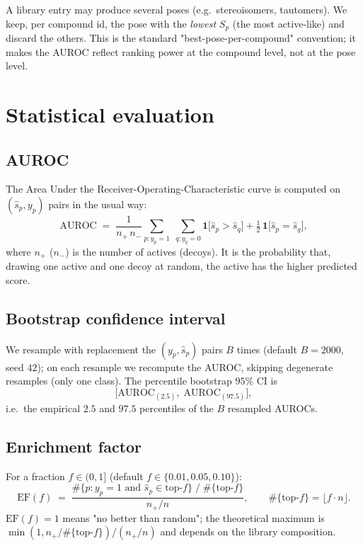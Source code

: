 \documentclass[11pt]{article}
\newcommand{\Indic}{\mathbf{1}}
\begin{document}
A library entry may produce several poses (e.g.\ stereoisomers,
tautomers). We keep, per compound id, the pose with the \emph{lowest}
$S_p$ (the most active-like) and discard the others. This is the
standard "best-pose-per-compound" convention; it makes the AUROC reflect
ranking power at the compound level, not at the pose level.

\section{Statistical evaluation}

\subsection{AUROC}

The Area Under the Receiver-Operating-Characteristic curve is computed
on $(\hat s_p, y_p)$ pairs in the usual way:
\begin{equation}
\mathrm{AUROC} \;=\;
\frac{1}{n_+\,n_-}
\sum_{p : y_p=1}\;\sum_{q : y_q=0}
\Indic\!\bigl[\hat s_p > \hat s_q\bigr] +
\tfrac12\,\Indic\!\bigl[\hat s_p = \hat s_q\bigr],
\end{equation}
where $n_+$ ($n_-$) is the number of actives (decoys). It is the
probability that, drawing one active and one decoy at random, the active
has the higher predicted score.

\subsection{Bootstrap confidence interval}

We resample with replacement the $(y_p, \hat s_p)$ pairs $B$ times
(default $B=2000$, seed $42$); on each resample we recompute the AUROC,
skipping degenerate resamples (only one class). The percentile bootstrap
$95\%$ CI is
\[
\bigl[\mathrm{AUROC}_{(2.5)},\;\mathrm{AUROC}_{(97.5)}\bigr],
\]
i.e.\ the empirical $2.5$ and $97.5$ percentiles of the $B$ resampled
AUROCs.

\subsection{Enrichment factor}

For a fraction $f \in (0,1]$ (default $f \in \{0.01, 0.05, 0.10\}$):
\begin{equation}
\mathrm{EF}(f) \;=\;
\dfrac{
    \#\{p : y_p=1 \text{ and } \hat s_p \in \text{top-}f \}
    \;/\;
    \#\{\text{top-}f\}
}{
    n_+ / n
},
\qquad
\#\{\text{top-}f\} = \lfloor f \cdot n \rfloor.
\end{equation}
$\mathrm{EF}(f)=1$ means "no better than random"; the theoretical maximum
is $\min(1, n_+/\#\{\text{top-}f\}) / (n_+/n)$ and depends on the library
composition.
\end{document}
